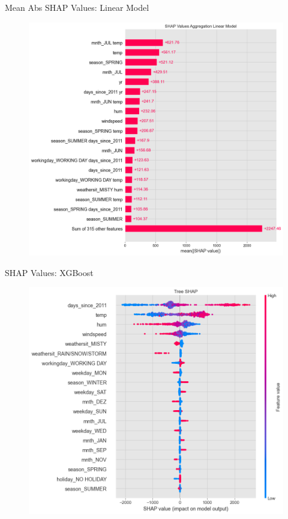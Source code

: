 \documentclass[10pt]{beamer}
\begin{document}
\begin{frame}{Mean Abs SHAP Values: Linear Model}
\begin{center}
  \begin{figure}
    \includegraphics[scale=0.3]{images/interpretable_ml_116_0.png}
  \end{figure}
\end{center}
\end{frame}

\begin{frame}{SHAP Values: XGBoost}
\begin{center}
  \begin{figure}
    \includegraphics[scale=0.35]{images/interpretable_ml_127_0.png}
  \end{figure}
\end{center}
\end{frame}
\end{document}
